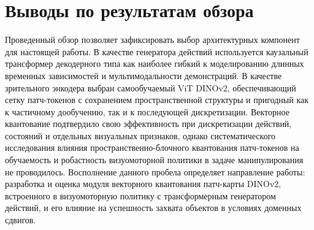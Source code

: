 \section{Выводы по результатам обзора}

Проведенный обзор позволяет зафиксировать выбор архитектурных компонент для настоящей работы. В качестве генератора действий используется каузальный трансформер декодерного типа как наиболее гибкий к моделированию длинных временных зависимостей и мультимодальности демонстраций. В качестве зрительного энкодера выбран самообучаемый ViT DINOv2, обеспечивающий сетку патч-токенов с сохранением пространственной структуры и пригодный как к частичному дообучению, так и к последующей дискретизации. Векторное квантование подтвердило свою эффективность при дискретизации действий, состояний и отдельных визуальных признаков, однако систематического исследования влияния пространственно-блочного квантования патч-токенов на обучаемость и робастность визуомоторной политики в задаче манипулирования не проводилось. Восполнение данного пробела определяет направление работы: разработка и оценка модуля векторного квантования патч-карты DINOv2, встроенного в визуомоторную политику с трансформерным генератором действий, и его влияние на успешность захвата объектов в условиях доменных сдвигов.

\endinput
